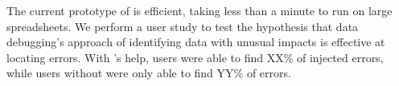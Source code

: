 The current prototype of \checkcell{} is efficient, taking less than a
minute to run on large spreadsheets. We perform a user study to test
the hypothesis that data debugging's approach of identifying data with
unusual impacts is effective at locating errors. With \checkcell{}'s
help, users were able to find XX\% of injected errors, while users
without \checkcell{} were only able to find YY\% of errors.


